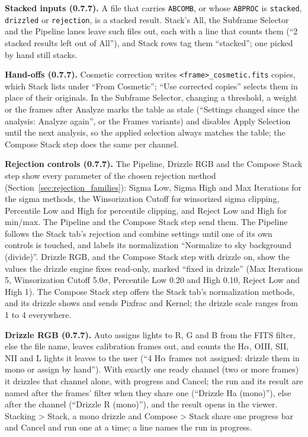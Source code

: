 \documentclass[11pt,a4paper]{article}
\newcommand{\code}[1]{\texttt{\small #1}}
\begin{document}
    \textbf{Stacked inputs (0.7.7).} A file that carries \code{ABCOMB}, or whose \code{ABPROC} is \code{stacked}, \code{drizzled} or \code{rejection}, is a stacked result. Stack's All, the Subframe Selector and the Pipeline lanes leave such files out, each with a line that counts them (``2 stacked results left out of All''), and Stack rows tag them ``stacked''; one picked by hand still stacks.

    \textbf{Hand-offs (0.7.7).} Cosmetic correction writes \code{<frame>\_cosmetic.fits} copies, which Stack lists under ``From Cosmetic''; ``Use corrected copies'' selects them in place of their originals. In the Subframe Selector, changing a threshold, a weight or the frames after Analyze marks the table as stale (``Settings changed since the analysis: Analyze again'', or the Frames variants) and disables Apply Selection until the next analysis, so the applied selection always matches the table; the Compose Stack step does the same per channel.

    \textbf{Rejection controls (0.7.7).} The Pipeline, Drizzle RGB and the Compose Stack step show every parameter of the chosen rejection method (Section~\ref{sec:rejection_families}): Sigma Low, Sigma High and Max Iterations for the sigma methods, the Winsorization Cutoff for winsorized sigma clipping, Percentile Low and High for percentile clipping, and Reject Low and High for min/max. The Pipeline and the Compose Stack step send them. The Pipeline follows the Stack tab's rejection and combine settings until one of its own controls is touched, and labels its normalization ``Normalize to sky background (divide)''. Drizzle RGB, and the Compose Stack step with drizzle on, show the values the drizzle engine fixes read-only, marked ``fixed in drizzle'' (Max Iterations 5, Winsorization Cutoff 5.0$\sigma$, Percentile Low 0.20 and High 0.10, Reject Low and High 1). The Compose Stack step offers the Stack tab's normalization methods, and its drizzle shows and sends Pixfrac and Kernel; the drizzle scale ranges from 1 to 4 everywhere.

    \textbf{Drizzle RGB (0.7.7).} Auto assigns lights to R, G and B from the FITS filter, else the file name, leaves calibration frames out, and counts the H$\alpha$, OIII, SII, NII and L lights it leaves to the user (``4 H$\alpha$ frames not assigned: drizzle them in mono or assign by hand''). With exactly one ready channel (two or more frames) it drizzles that channel alone, with progress and Cancel; the run and its result are named after the frames' filter when they share one (``Drizzle Ha (mono)''), else after the channel (``Drizzle R (mono)''), and the result opens in the viewer. Stacking \textgreater{} Stack, a mono drizzle and Compose \textgreater{} Stack share one progress bar and Cancel and run one at a time; a line names the run in progress.
\end{document}
